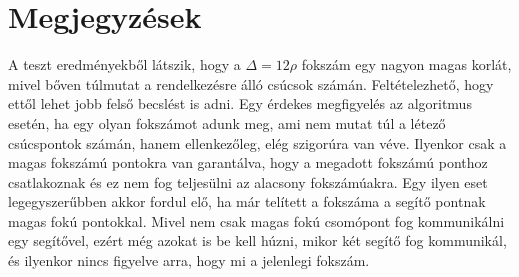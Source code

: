 \documentclass[12pt]{report}
\begin{document}
\section{Megjegyzések}

A teszt eredményekből látszik, hogy a $\Delta=12\rho$ fokszám egy nagyon magas korlát, mivel bőven túlmutat a rendelkezésre álló csúcsok számán. Feltételezhető, hogy ettől lehet jobb felső becslést is adni. 
Egy érdekes megfigyelés az algoritmus esetén, ha egy olyan fokszámot adunk meg, ami nem mutat túl a létező csúcspontok számán, hanem ellenkezőleg, elég szigorúra van véve.
Ilyenkor csak a magas fokszámú pontokra van garantálva, hogy a megadott fokszámú ponthoz csatlakoznak és ez nem fog teljesülni az alacsony fokszámúakra.
Egy ilyen eset legegyszerűbben akkor fordul elő, ha már telített a fokszáma a segítő pontnak magas fokú pontokkal. 
Mivel nem csak magas fokú csomópont fog kommunikálni egy segítővel, ezért még azokat is be kell húzni, mikor két segítő fog kommunikál, és ilyenkor nincs figyelve arra, hogy mi a jelenlegi fokszám. 




	
\end{document}
